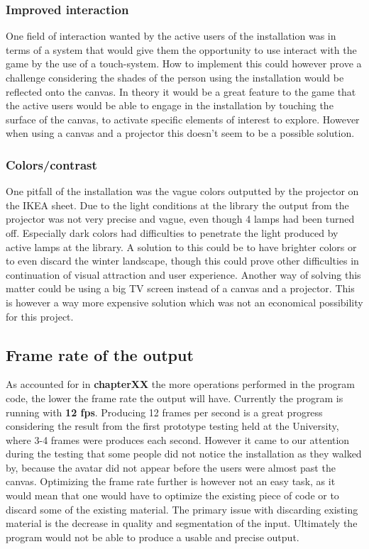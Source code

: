 \subsubsection{Improved interaction}
One field of interaction wanted by the active users of the installation was in terms of a system that would give them the opportunity to use interact with the game by the use of a touch-system. How to implement this could however prove a challenge considering the shades of the person using the installation would be reflected onto the canvas. In theory it would be a great feature to the game that the active users would be able to engage in the installation by touching the surface of the canvas, to activate specific elements of interest to explore. However when using a canvas and a projector this doesn't seem to be a possible solution.


\subsubsection{Colors/contrast}
One pitfall of the installation was the vague colors outputted by the projector on the IKEA sheet. Due to the light conditions at the library the output from the projector was not very precise and vague, even though 4 lamps had been turned off. Especially dark colors had difficulties to penetrate the light produced by active lamps at the library. A solution to this could be to have brighter colors or to even discard the winter landscape, though this could prove other difficulties in continuation of visual attraction and user experience. Another way of solving this matter could be using a big TV screen instead of a canvas and a projector. This is however a way more expensive solution which was not an economical possibility for this project.
 
\subsection{Frame rate of the output}
As accounted for in \textbf{chapterXX} the more operations performed in the program code, the lower the frame rate the output will have. Currently the program is running with \textbf{12 fps}. Producing 12 frames per second is a great progress considering the result from the first prototype testing held at the University, where 3-4 frames were produces each second. However it came to our attention during the testing that some people did not notice the installation as they walked by, because the avatar did not appear before the users were almost past the canvas. Optimizing the frame rate further is however not an easy task, as it would mean that one would have to optimize the existing piece of code or to discard some of the existing material. The primary issue with discarding existing material is the decrease in quality and segmentation of the input. Ultimately the program would not be able to produce a usable and precise output.   
